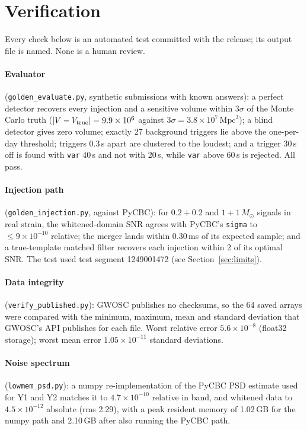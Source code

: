 \documentclass[11pt]{article}
\newcommand{\Msun}{\ensuremath{M_\odot}}
\begin{document}
\section{Verification}
Every check below is an automated test committed with the release; its output file is named. None is a human review.

\paragraph{Evaluator} (\texttt{golden\_evaluate.py}, synthetic submissions with known answers): a perfect detector
recovers every injection and a sensitive volume within $3\sigma$ of the Monte Carlo truth ($|V - V_{\rm true}| =
9.9\times10^6$ against $3\sigma = 3.8\times10^7\,\mathrm{Mpc}^3$); a blind detector gives zero volume; exactly 27
background triggers lie above the one-per-day threshold; triggers 0.3\,s apart are clustered to the loudest; and a
trigger 30\,s off is found with \texttt{var} 40\,s and not with 20\,s, while \texttt{var} above 60\,s is rejected.
All pass.

\paragraph{Injection path} (\texttt{golden\_injection.py}, against PyCBC): for $0.2+0.2$ and $1+1\,\Msun$ signals in
real strain, the whitened-domain SNR agrees with PyCBC's \texttt{sigma} to $\leq 9\times10^{-10}$ relative; the merger
lands within 0.30\,ms of its expected sample; and a true-template matched filter recovers each injection within 2 of
its optimal SNR. The test used test segment 1249001472 (see Section~\ref{sec:limits}).

\paragraph{Data integrity} (\texttt{verify\_published.py}): GWOSC publishes no checksums, so the 64 saved arrays were
compared with the minimum, maximum, mean and standard deviation that GWOSC's API publishes for each file. Worst
relative error $5.6\times10^{-8}$ (float32 storage); worst mean error $1.05\times10^{-11}$ standard deviations.

\paragraph{Noise spectrum} (\texttt{lowmem\_psd.py}): a numpy re-implementation of the PyCBC PSD estimate used for Y1
and Y2 matches it to $4.7\times10^{-10}$ relative in band, and whitened data to $4.5\times10^{-12}$ absolute (rms 2.29),
with a peak resident memory of 1.02\,GB for the numpy path and 2.10\,GB after also running the PyCBC path.
\end{document}
